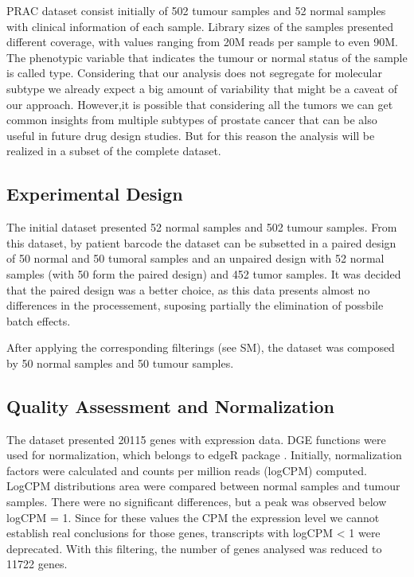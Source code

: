 \documentclass[9pt,twocolumn,twoside]{gsajnl}
\begin{document}
PRAC dataset consist initially of 502 tumour samples and 52 normal samples with clinical information of each sample. Library sizes of the samples presented different coverage, with values ranging from 20M reads per sample to even 90M.  The phenotypic variable that indicates the tumour or normal status of the sample is called type.  Considering that our analysis does not segregate for molecular subtype we already expect a big amount of variability that might be a caveat of our approach. However,it is possible that considering all the tumors we can get common insights from multiple subtypes of prostate cancer that can be also useful in future drug design studies. But for this reason the analysis will be realized in a subset of the complete dataset. 
\subsection*{Experimental Design}

The initial dataset presented 52 normal samples and 502 tumour samples. From this dataset, by patient barcode the dataset can be subsetted in a paired design of 50 normal and 50 tumoral samples and an unpaired design with 52 normal samples (with 50 form the paired design) and 452 tumor samples. It was decided that the paired design was a better choice, as this data presents almost no differences in the processement, suposing partially the elimination of possbile batch effects.

After applying the corresponding filterings (see SM), the dataset was composed by 50 normal samples and 50 tumour samples.

\subsection*{Quality Assessment and Normalization}

The dataset presented 20115 genes with expression data.  DGE functions were used for normalization, which belongs to edgeR package \cite{Robinson01012010}. Initially, normalization factors were calculated and counts per million reads (logCPM) computed. LogCPM distributions area were compared between normal samples and tumour samples. There were no significant differences, but a peak was observed below logCPM = 1. Since for these values the CPM the expression level we cannot establish real conclusions for those genes, transcripts with logCPM < 1 were deprecated. With this filtering, the number of genes analysed was reduced to 11722 genes. 
\end{document}
